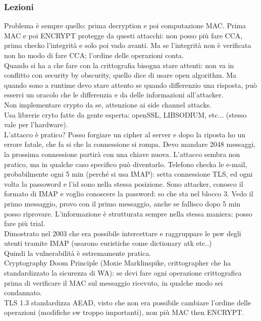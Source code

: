 \documentclass[16px]{article}
\begin{document}
\subsubsection{Lezioni}
Problema è sempre quello: prima decryption e poi computazione MAC. Prima MAC e poi ENCRYPT protegge da questi attacchi: non posso più fare CCA, prima checko l'integrità e solo poi vado avanti. Ma se l'integrità non è verificata non ho modo di fare CCA; l'ordine delle operazioni conta.\\ Quando si ha a che fare con la crittografia bisogna stare attenti: non va in conflitto con security by obscurity, quello dice di usare open algorithm. Ma quando sono a runtime devo stare attento se quando differenzio una risposta, può esserci un oracolo che le differenzia e da delle informazioni all'attacker.\\ Non implementare crypto da se, attenzione ai side channel attacks.\\ Usa librerie cryto fatte da gente esperta: openSSL, LIBSODIUM, etc... (stesso vale per l'hardware).\\ L'attacco è pratico? Posso forgiare un cipher al server e dopo la riposta ho un errore fatale, che fa si che la connessione si rompa. Devo mandare 2048 messaggi, la prossima connessione partirà con una chiave nuova. L'attacco sembra non pratico, ma in qualche caso specifico può diventarlo. Telefono checka le e-mail, probabilmente ogni 5 min (perché si usa IMAP): setta connessione TLS, ed ogni volta la passoword e l'id sono nella stessa posizione. Sono attacker, conosco il formato di IMAP e voglio conoscere la password: so che sta nel blocco 3. Vedo il primo messaggio, provo con il primo messaggio, anche se fallisco dopo 5 min posso riprovare. L'informazione è strutturata sempre nella stessa maniera: posso fare più trial.\\ Dimostrato nel 2003 che era possibile intercettare e raggruppare le psw degli utenti tramite IMAP (usarono euristiche come dictionary atk etc..)\\ Quindi la vulnerabilità è estremamente pratica.\\ Cryptography Doom Principle (Moxie Marklinspike, crittographer che ha standardizzato la sicurezza di WA): se devi fare ogni operazione crittografica prima di verificare il MAC sul messaggio ricevuto, in qualche modo sei condannato.\\ TLS 1.3 standardizza AEAD, visto che non era possibile cambiare l'ordine delle operazioni (modifiche sw troppo importanti), non più MAC then ENCRYPT.
\end{document}
